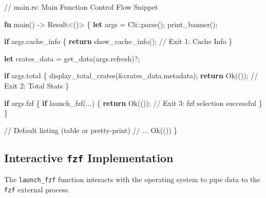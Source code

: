 \documentclass[
  letterpaper,
  DIV=11,
  numbers=noendperiod]{scrreprt}
\newenvironment{Shaded}{\begin{snugshade}}{\end{snugshade}}
\newcommand{\CommentTok}[1]{\textcolor[rgb]{0.37,0.37,0.37}{#1}}
\newcommand{\ConstantTok}[1]{\textcolor[rgb]{0.56,0.35,0.01}{#1}}
\newcommand{\ControlFlowTok}[1]{\textcolor[rgb]{0.00,0.23,0.31}{\textbf{#1}}}
\newcommand{\DataTypeTok}[1]{\textcolor[rgb]{0.68,0.00,0.00}{#1}}
\newcommand{\KeywordTok}[1]{\textcolor[rgb]{0.00,0.23,0.31}{\textbf{#1}}}
\newcommand{\NormalTok}[1]{\textcolor[rgb]{0.00,0.23,0.31}{#1}}
\newcommand{\OperatorTok}[1]{\textcolor[rgb]{0.37,0.37,0.37}{#1}}
\newcommand{\PreprocessorTok}[1]{\textcolor[rgb]{0.68,0.00,0.00}{#1}}
\begin{document}
\begin{Shaded}
\begin{Highlighting}[]
\CommentTok{// main.rs: Main Function Control Flow Snippet}

\KeywordTok{fn}\NormalTok{ main() }\OperatorTok{{-}\textgreater{}} \DataTypeTok{Result}\OperatorTok{\textless{}}\NormalTok{()}\OperatorTok{\textgreater{}} \OperatorTok{\{}
    \KeywordTok{let}\NormalTok{ args }\OperatorTok{=} \PreprocessorTok{Cli::}\NormalTok{parse()}\OperatorTok{;}
\NormalTok{    print\_banner()}\OperatorTok{;}

    \ControlFlowTok{if}\NormalTok{ args}\OperatorTok{.}\NormalTok{cache\_info }\OperatorTok{\{}
        \ControlFlowTok{return}\NormalTok{ show\_cache\_info()}\OperatorTok{;} \CommentTok{// Exit 1: Cache Info}
    \OperatorTok{\}}

    \KeywordTok{let}\NormalTok{ crates\_data }\OperatorTok{=}\NormalTok{ get\_data(args}\OperatorTok{.}\NormalTok{refresh)}\OperatorTok{?;}

    \ControlFlowTok{if}\NormalTok{ args}\OperatorTok{.}\NormalTok{total }\OperatorTok{\{}
\NormalTok{        display\_total\_crates(}\OperatorTok{\&}\NormalTok{crates\_data}\OperatorTok{.}\NormalTok{metadata)}\OperatorTok{;}
        \ControlFlowTok{return} \ConstantTok{Ok}\NormalTok{(())}\OperatorTok{;} \CommentTok{// Exit 2: Total Stats}
    \OperatorTok{\}}

    \ControlFlowTok{if}\NormalTok{ args}\OperatorTok{.}\NormalTok{fzf }\OperatorTok{\{}
        \ControlFlowTok{if}\NormalTok{ launch\_fzf(}\OperatorTok{...}\NormalTok{) }\OperatorTok{\{}
            \ControlFlowTok{return} \ConstantTok{Ok}\NormalTok{(())}\OperatorTok{;} \CommentTok{// Exit 3: fzf selection successful}
        \OperatorTok{\}}
    \OperatorTok{\}}

    \CommentTok{// Default listing (table or pretty{-}print)}
    \CommentTok{// ...}
    \ConstantTok{Ok}\NormalTok{(())}
\OperatorTok{\}}
\end{Highlighting}
\end{Shaded}

\subsection{\texorpdfstring{Interactive \texttt{fzf}
Implementation}{Interactive fzf Implementation}}\label{interactive-fzf-implementation}

The \texttt{launch\_fzf} function interacts with the operating system to
pipe data to the \texttt{fzf} external process.
\end{document}
